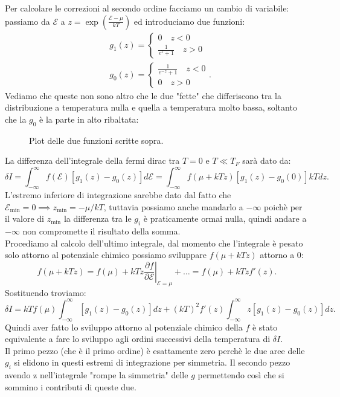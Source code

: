 Per calcolare le correzioni al secondo ordine facciamo un cambio di variabile: passiamo da $\mathcal{E} $ a $z = \exp\left( \frac{\mathcal{E} -\mu }{kT} \right) $ ed introduciamo due funzioni: 
 \begin{align}
	&g_1( z)  = \begin{cases} 
		0 \quad z <0\\
		\frac{1}{e^{z}+1} \quad z > 0 \label{eq:g_1}
	\end{cases}\\
	&g_0( z) =
 \begin{cases}
		\frac{1}{e^{-z}+1} \quad z < 0 \label{eq:g_0}\\
		0 \quad z >0
	\end{cases}
.\end{align}
Vediamo che queste non sono altro che le due "fette" che differiscono tra la distribuzione a temperatura nulla e quella a temperatura molto bassa, soltanto che la $g_0$ è la parte in alto ribaltata:
\begin{figure}[H]
    \centering
    \caption{\scriptsize Plot delle due funzioni scritte sopra.}
    \label{fig:g1-e-g0}
\end{figure}
La differenza dell'integrale della fermi dirac tra $T=0$ e  $T\ll T_{F}$ sarà dato da:
\[
	\delta I = \int_{-\infty}^{\infty} f( \mathcal{E} ) \left[ g_1( z) - g_0( z)  \right] d\mathcal{E}   = \int_{-\infty}^{\infty}  f ( \mu + kTz) 
	\left[ g_1( z) - g_0( 0)  \right] kT dz
.\] 
L'estremo inferiore di integrazione sarebbe dato dal fatto che $\mathcal{E} _{\text{min}}=0 \implies z_{\text{min}}= - \mu /kT$, tuttavia possiamo anche mandarlo a $-\infty$ poichè per il valore di $z_{\text{min}}$ la differenza tra le $g_{i}$ è praticamente ormai nulla, quindi andare a $-\infty$ non compromette il risultato della somma.\\
Procediamo al calcolo dell'ultimo integrale, dal momento che l'integrale è pesato solo attorno al potenziale chimico possiamo sviluppare $f( \mu + kTz) $ attorno a $0$:
\[
	f( \mu + kTz) = f( \mu )  + kTz \left.\frac{\partial f}{\partial \mathcal{E}  } \right|_{\mathcal{E} =\mu } + \ldots= f( \mu )+ kTzf'( z)  
.\] 
Sostituendo troviamo:
\[
	\delta I = kTf( \mu )  \int_{-\infty}^{\infty} \left[ g_1( z)- g_0( z)   \right] dz + ( kT) ^2f'( z) \int_{-\infty}^{\infty} z \left[ g_1( z) -g_0( z)  \right] dz  
.\] 
Quindi aver fatto lo sviluppo attorno al potenziale chimico della $f$ è stato equivalente a fare lo sviluppo agli ordini successivi della temperatura di $\delta I$.\\
Il primo pezzo (che è il primo ordine) è esattamente zero perchè le due aree delle $g_{i}$ si elidono in questi estremi di integrazione per simmetria. Il secondo pezzo avendo z nell'integrale "rompe la simmetria" delle $g$ permettendo così che si sommino i contributi di queste due.
